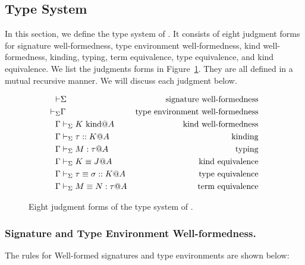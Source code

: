 
\subsection{Type System}

In this section, we define the type system of \LMD.
It consists of eight judgment forms for signature well-formedness, type environment well-formedness, kind well-formedness, kinding, typing, term equivalence, type equivalence, and kind equivalence.
We list the judgments forms in Figure~\ref{fig:LMD-six-judgments}.
They are all defined in a mutual recursive manner.  We will discuss
each judgment below.

\begin{figure}[tbp]
  \begin{center}
    \begin{align*}
      \vdash & \Sigma                     & \text{signature well-formedness}        \\
      \vdash_\Sigma     & \Gamma                         & \text{type environment well-formedness} \\
      \Gamma     & \vdash_\Sigma K \text{\ kind} @ A           & \text{kind well-formedness}             \\
      \Gamma     & \vdash_\Sigma \tau :: K @ A           & \text{kinding}                          \\
      \Gamma     & \vdash_\Sigma M : \tau @ A            & \text{typing}                           \\
      \Gamma     & \vdash_\Sigma K \equiv J @ A              & \text{kind equivalence}                 \\
      \Gamma     & \vdash_\Sigma \tau \equiv \sigma :: K @ A & \text{type equivalence}                 \\
      \Gamma     & \vdash_\Sigma M \equiv N : \tau @ A       & \text{term equivalence}
    \end{align*}
    \caption{Eight judgment forms of the type system of \LMD.}
    \label{fig:LMD-six-judgments}
  \end{center}
\end{figure}


\subsubsection{Signature and Type Environment Well-formedness.}
The rules for Well-formed signatures and type environments are
shown below:
%
{\small
\begin{center}
  \infrule{
  }{
    \vdash \emptyset
  }
  \hfil
  \hfil
  \\[2mm]
  \infrule{
  }{
    \V \emptyset
  }
  \hfil
\end{center}
}

